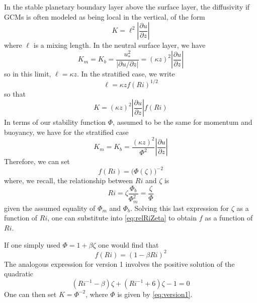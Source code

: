 \documentclass[12pt, letterpaper]{article}
\begin{document}
In the stable planetary boundary layer above the surface layer, the
diffusivity if GCMs is often modeled as being local in the vertical,
of the form
\begin{equation}
  K = \ell^2\left|\frac{\partial u}{\partial z}\right|
\end{equation}
where $\ell$ is a mixing length.  In the neutral surface layer, we have
\begin{equation}
  K_m = K_b = \frac{u_*^2}{|\partial u/\partial z|} = (\kappa z)^2\left|\frac{\partial u}{\partial z}\right|
\end{equation}
so in this limit, $\ell = \kappa z$.  In the stratified case, we write
\begin{equation}
  \ell = \kappa z f(Ri)^{1/2}
\end{equation}
so that
\begin{equation}
  K = (\kappa z)^2 \left|\frac{\partial u}{\partial z}\right|f(Ri) \label{eq:stratifiedcase}
\end{equation}
In terms of our stability function $\Phi$, assumed to be the same for
momentum and buoyancy, we have for the stratified case
\begin{equation}
  K_m = K_b = \frac{(\kappa z)^2}{\Phi^2}\left|\frac{\partial u}{\partial z}\right|
\end{equation}
Therefore, we can set
\begin{equation}
  f(Ri) = \big(\Phi(\zeta)\big)^{-2} \label{eq:relRiZeta}
\end{equation}
where, we recall, the relationship between $Ri$ and $\zeta$ is
\begin{equation}
  Ri = \zeta\frac{\Phi_b}{\Phi_m^2} = \frac{\zeta}{\Phi}
\end{equation}
given the assumed equality of $\Phi_m$ and $\Phi_b$.  Solving this
last expression for $\zeta$ as a function of $Ri$, one can substitute
into \eqref{eq:relRiZeta} to obtain $f$ as a function of $Ri$.

If one simply used $\Phi = 1 + \beta\zeta$ one would find that
\begin{equation}
  f(Ri) = (1-\beta Ri)^2
\end{equation}
The analogous expression for version 1 involves the positive solution
of the quadratic
\begin{equation}
  (Ri^{-1}-\beta)\zeta+(Ri^{-1}+6)\zeta-1 = 0
\end{equation}
One can then set $K=\Phi^{-2}$, where $\Phi$ is given by
\eqref{eq:version1}.
\end{document}
